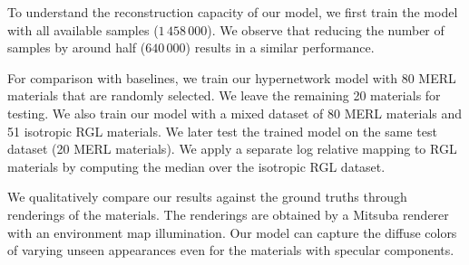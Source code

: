 To understand the reconstruction capacity of our model, we first train the model with all available samples ($1\,458\,000$). We observe that reducing the number of samples by around half ($640\,000$) results in a similar performance.
\begin{table}[ht]
    \centering
    \caption{Hypernetwork - Average metric results across varying sample sizes ($N$) over the test set (Sparse and full reconstruction of unseen materials).}

    \label{table: ours_large_samples}
\end{table}


For comparison with baselines, we train our hypernetwork model with 80 MERL materials that are randomly selected. We leave the remaining 20 materials for testing. We also train our model with a mixed dataset of 80 MERL materials and 51 isotropic RGL materials. We later test the trained model on the same test dataset (20 MERL materials). We apply a separate log relative mapping to RGL materials by computing the median over the isotropic RGL dataset.
 
 We qualitatively compare our results against the ground truths through renderings of the materials. The renderings are obtained by a Mitsuba renderer with an environment map illumination. Our model can capture the diffuse colors of varying unseen appearances even for the materials with specular components. 



